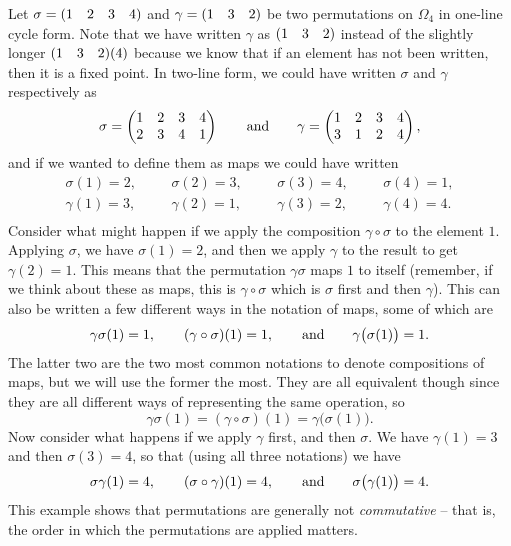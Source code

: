 \begin{example}\label{eg:siggam}
    Let $\sigma = (1 \quad 2 \quad 3 \quad 4)$ and $\gamma = (1 \quad 3 \quad 2)$ be two permutations on $\Omega_{4}$ in one-line cycle form. Note that we have written $\gamma$ as $(1 \quad 3 \quad 2)$ instead of the slightly longer $(1 \quad 3 \quad 2)(4)$ because we know that if an element has not been written, then it is a fixed point. In two-line form, we could have written $\sigma$ and $\gamma$ respectively as
    \[
    \sigma = \begin{pmatrix}
        1 & 2 & 3 & 4 \\
        2 & 3 & 4 & 1 \\
    \end{pmatrix} \hspace{20pt}\text{and}\hspace{20pt} \gamma = \begin{pmatrix}
        1 & 2 & 3 & 4 \\
        3 & 1 & 2 & 4 \\
    \end{pmatrix},
    \]
    and if we wanted to define them as maps we could have written
    \[
    \begin{array}{cccc}
        \sigma(1) = 2, \hspace{20pt} & \sigma(2) = 3, \hspace{20pt} & \sigma(3) = 4, \hspace{20pt} & \sigma(4) = 1, \\[8pt]
        \gamma(1) = 3, \hspace{20pt} & \gamma(2) = 1, \hspace{20pt} & \gamma(3) = 2, \hspace{20pt} & \gamma(4) = 4. \\
    \end{array}
    \]
    Consider what might happen if we apply the composition $\gamma\circ\sigma$ to the element $1$. Applying $\sigma$, we have $\sigma(1) = 2$, and then we apply $\gamma$ to the result to get $\gamma(2) = 1$. This means that the permutation $\gamma\sigma$ maps $1$ to itself (remember, if we think about these as maps, this is $\gamma \circ \sigma$ which is $\sigma$ first and then $\gamma$). This can also be written a few different ways in the notation of maps, some of which are
    \[
    \gamma\sigma(1) = 1, \hspace{20pt} (\gamma \circ \sigma)(1) = 1, \hspace{20pt}\text{and}\hspace{20pt} \gamma\big(\sigma(1)\big) = 1.
    \]
    The latter two are the two most common notations to denote compositions of maps, but we will use the former the most. They are all equivalent though since they are all different ways of representing the same operation, so
    \[
    \gamma\sigma(1) = (\gamma \circ \sigma)(1) = \gamma\big(\sigma(1)\big).
    \]
    Now consider what happens if we apply $\gamma$ first, and then $\sigma$. We have $\gamma(1) = 3$ and then $\sigma(3) = 4$, so that (using all three notations) we have
    \[
    \sigma\gamma(1) = 4, \hspace{20pt} (\sigma \circ \gamma)(1) = 4, \hspace{20pt}\text{and}\hspace{20pt} \sigma\big(\gamma(1)\big) = 4.
    \]
    This example shows that permutations are generally not \textit{commutative} -- that is, the order in which the permutations are applied matters.


\end{example}
